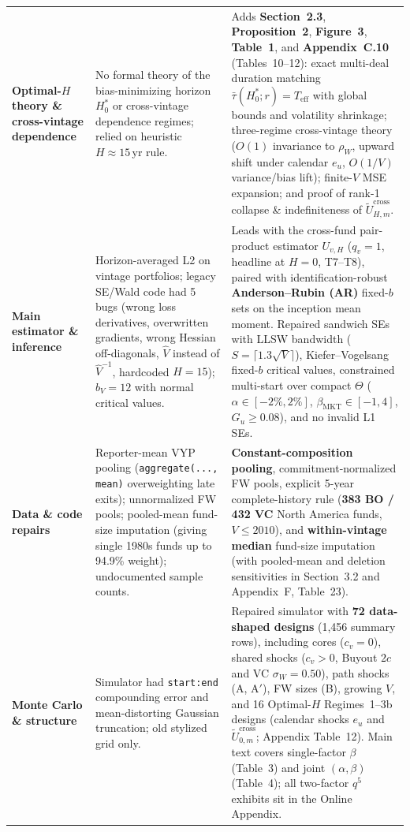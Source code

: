 \documentclass[10.5pt]{article}
\begin{document}
{\begin{tabularx}{\textwidth}{@{}>{\raggedright\arraybackslash}p{2.4cm} X X@{}}
\addlinespace[2pt]
\textbf{Optimal-$H$ theory \& cross-vintage dependence} &
  No formal theory of the bias-minimizing horizon $H_0^\ast$ or cross-vintage dependence regimes; relied on heuristic $H\approx 15$\,yr rule. &
  Adds \textbf{Section~2.3}, \textbf{Proposition~2}, \textbf{Figure~3}, \textbf{Table~1}, and \textbf{Appendix~C.10} (Tables~10--12): exact multi-deal duration matching $\bar\tau(H_0^\ast;r)=T_{\mathrm{eff}}$ with global bounds and volatility shrinkage; three-regime cross-vintage theory ($O(1)$ invariance to $\rho_W$, upward shift under calendar $e_u$, $O(1/V)$ variance/bias lift); finite-$V$ MSE expansion; and proof of rank-1 collapse \& indefiniteness of $\widetilde{U}_{H,m}^{\mathrm{cross}}$. \\
\addlinespace[2pt]
\textbf{Main estimator \& inference} &
  Horizon-averaged L2 on vintage portfolios; legacy SE/Wald code had 5 bugs (wrong loss derivatives, overwritten gradients, wrong Hessian off-diagonals, $\widehat V$ instead of $\widehat V^{-1}$, hardcoded $H=15$); $b_V=12$ with normal critical values. &
  Leads with the cross-fund pair-product estimator \textbf{$U_{v,H}$} ($q_v=1$, headline at $H=0$, T7--T8), paired with identification-robust \textbf{Anderson--Rubin (AR)} fixed-$b$ sets on the inception mean moment. Repaired sandwich SEs with LLSW bandwidth ($S=\lceil 1.3\sqrt{V}\rceil$), Kiefer--Vogelsang fixed-$b$ critical values, constrained multi-start over compact $\Theta$ ($\alpha\in[-2\%,2\%]$, $\beta_{\mathrm{MKT}}\in[-1,4]$, $G_u\ge 0.08$), and no invalid L1 SEs. \\
\addlinespace[2pt]
\textbf{Data \& code repairs} &
  Reporter-mean VYP pooling (\texttt{aggregate(..., mean)} overweighting late exits); unnormalized FW pools; pooled-mean fund-size imputation (giving single 1980s funds up to 94.9\% weight); undocumented sample counts. &
  \textbf{Constant-composition pooling}, commitment-normalized FW pools, explicit 5-year complete-history rule (\textbf{383 BO / 432 VC} North America funds, $V\le 2010$), and \textbf{within-vintage median} fund-size imputation (with pooled-mean and deletion sensitivities in Section~3.2 and Appendix~F, Table~23). \\
\addlinespace[2pt]
\textbf{Monte Carlo \& structure} &
  Simulator had \texttt{start:end} compounding error and mean-distorting Gaussian truncation; old stylized grid only. &
  Repaired simulator with \textbf{72 data-shaped designs} (1,456 summary rows), including cores ($c_v=0$), shared shocks ($c_v>0$, Buyout $2c$ and VC $\sigma_W=0.50$), path shocks (A, A$'$), FW sizes (B), growing $V$, and 16 Optimal-$H$ Regimes~1--3b designs (calendar shocks $e_u$ and $\widetilde{U}_{0,m}^{\mathrm{cross}}$; Appendix Table~12). Main text covers single-factor $\beta$ (Table~3) and joint $(\alpha,\beta)$ (Table~4); all two-factor $q^5$ exhibits sit in the Online Appendix. \\

\end{tabularx}}
\end{document}

